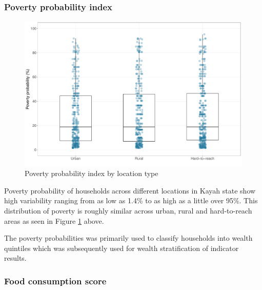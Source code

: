 \documentclass[12pt,a4paper]{article}
\begin{document}
\hypertarget{ppi-results}{%
\subsubsection{Poverty probability index}\label{ppi-results}}

\begin{figure}[H]

{\centering \includegraphics{kayahReport_files/figure-latex/ppiTable-1} 

}

\caption{Poverty probability index by location type}\label{fig:ppiTable}
\end{figure}

Poverty probability of households across different locations in Kayah state show high variability ranging from as low as 1.4\% to as high as a little over 95\%. This distribution of poverty is roughly similar across urban, rural and hard-to-reach areas as seen in Figure \ref{fig:ppiTable} above.

The poverty probabilities was primarily used to classify households into wealth quintiles which was subsequently used for wealth stratification of indicator results.

\hypertarget{fcs-results}{%
\subsubsection{Food consumption score}\label{fcs-results}}
\end{document}
